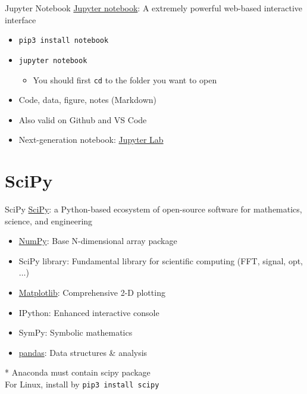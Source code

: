 \documentclass{../TexTemplate/myslide}
\begin{document}
\begin{frame}[fragile]{Jupyter Notebook}
\href{https://jupyter.org/}{Jupyter notebook}: A extremely powerful web-based interactive interface
\begin{itemize}
	\item \verb'pip3 install notebook'
	\item \verb'jupyter notebook'
	\begin{itemize}
		\item You should first \verb'cd' to the folder you want to open
	\end{itemize}
	\item Code, data, figure, notes (Markdown)
	\item Also valid on Github and VS Code
	\item Next-generation notebook: \href{https://jupyter.org/}{Jupyter Lab}
\end{itemize}
\end{frame}

\section{SciPy}
\begin{frame}
\sectionpage
\end{frame}

\begin{frame}[fragile]{SciPy}
\href{https://www.scipy.org/}{SciPy}: a Python-based ecosystem of open-source software for mathematics, science, and engineering
\begin{itemize}
	\item \underline{NumPy}: Base N-dimensional array package
	\item SciPy library: Fundamental library for scientific computing (FFT, signal, opt, $\ldots$)
	\item \underline{Matplotlib}: Comprehensive 2-D plotting
	\item IPython: Enhanced interactive console
	\item SymPy: Symbolic mathematics
	\item \underline{pandas}: Data structures \& analysis
\end{itemize}
* Anaconda must contain scipy package\\
For Linux, install by \verb'pip3 install scipy'
\end{frame}
\end{document}
